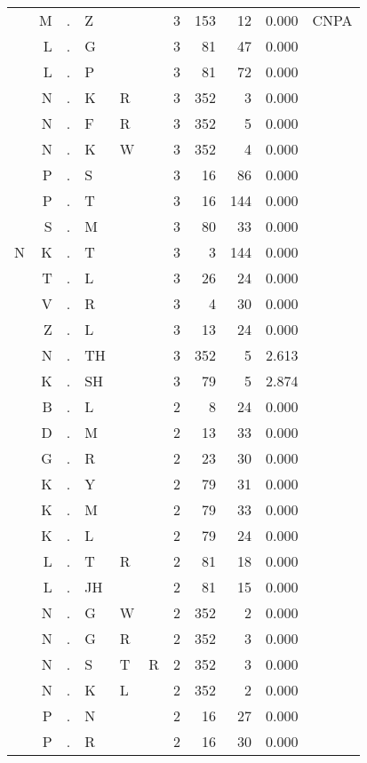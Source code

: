 \begin{longtable}{r@{ } r@{ } c@{ } l@{ } l@{ } l@{ } r r r r l }
  & M & . & Z &   &   & 3 & 153 & 12 & 0.000 & \textsc{CNPA} \\
  & L & . & G &   &   & 3 & 81 & 47 & 0.000 &  \\
  & L & . & P &   &   & 3 & 81 & 72 & 0.000 &  \\
  & N & . & K & R &   & 3 & 352 & 3 & 0.000 &  \\
  & N & . & F & R &   & 3 & 352 & 5 & 0.000 &  \\
  & N & . & K & W &   & 3 & 352 & 4 & 0.000 &  \\
  & P & . & S &   &   & 3 & 16 & 86 & 0.000 &  \\
  & P & . & T &   &   & 3 & 16 & 144 & 0.000 &  \\
  & S & . & M &   &   & 3 & 80 & 33 & 0.000 &  \\
N & K & . & T &   &   & 3 & 3 & 144 & 0.000 &  \\
  & T & . & L &   &   & 3 & 26 & 24 & 0.000 &  \\
  & V & . & R &   &   & 3 & 4 & 30 & 0.000 &  \\
  & Z & . & L &   &   & 3 & 13 & 24 & 0.000 &  \\
  & N & . & TH &   &   & 3 & 352 & 5 & 2.613 &  \\
  & K & . & SH &   &   & 3 & 79 & 5 & 2.874 &  \\
  & B & . & L &   &   & 2 & 8 & 24 & 0.000 &  \\
  & D & . & M &   &   & 2 & 13 & 33 & 0.000 &  \\
  & G & . & R &   &   & 2 & 23 & 30 & 0.000 &  \\
  & K & . & Y &   &   & 2 & 79 & 31 & 0.000 &  \\
  & K & . & M &   &   & 2 & 79 & 33 & 0.000 &  \\
  & K & . & L &   &   & 2 & 79 & 24 & 0.000 &  \\
  & L & . & T & R &   & 2 & 81 & 18 & 0.000 &  \\
  & L & . & JH &   &   & 2 & 81 & 15 & 0.000 &  \\
  & N & . & G & W &   & 2 & 352 & 2 & 0.000 &  \\
  & N & . & G & R &   & 2 & 352 & 3 & 0.000 &  \\
  & N & . & S & T & R & 2 & 352 & 3 & 0.000 &  \\
  & N & . & K & L &   & 2 & 352 & 2 & 0.000 &  \\
  & P & . & N &   &   & 2 & 16 & 27 & 0.000 &  \\
  & P & . & R &   &   & 2 & 16 & 30 & 0.000 &  \\

\end{longtable}
